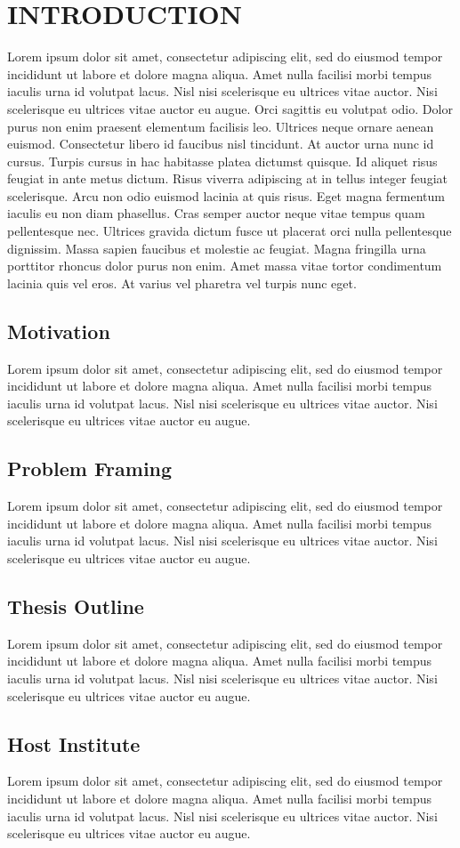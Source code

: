 \chapter{INTRODUCTION}
Lorem ipsum dolor sit amet, consectetur adipiscing elit, sed do eiusmod tempor incididunt ut labore et dolore magna aliqua. Amet nulla facilisi morbi tempus iaculis urna id volutpat lacus. Nisl nisi scelerisque eu ultrices vitae auctor. Nisi scelerisque eu ultrices vitae auctor eu augue. Orci sagittis eu volutpat odio. Dolor purus non enim praesent elementum facilisis leo. Ultrices neque ornare aenean euismod. Consectetur libero id faucibus nisl tincidunt. At auctor urna nunc id cursus. Turpis cursus in hac habitasse platea dictumst quisque. Id aliquet risus feugiat in ante metus dictum. Risus viverra adipiscing at in tellus integer feugiat scelerisque. Arcu non odio euismod lacinia at quis risus. Eget magna fermentum iaculis eu non diam phasellus. Cras semper auctor neque vitae tempus quam pellentesque nec. Ultrices gravida dictum fusce ut placerat orci nulla pellentesque dignissim. Massa sapien faucibus et molestie ac feugiat. Magna fringilla urna porttitor rhoncus dolor purus non enim. Amet massa vitae tortor condimentum lacinia quis vel eros. At varius vel pharetra vel turpis nunc eget.

\section{Motivation}
Lorem ipsum dolor sit amet, consectetur adipiscing elit, sed do eiusmod tempor incididunt ut labore et dolore magna aliqua. Amet nulla facilisi morbi tempus iaculis urna id volutpat lacus. Nisl nisi scelerisque eu ultrices vitae auctor. Nisi scelerisque eu ultrices vitae auctor eu augue.

\section{Problem Framing}
Lorem ipsum dolor sit amet, consectetur adipiscing elit, sed do eiusmod tempor incididunt ut labore et dolore magna aliqua. Amet nulla facilisi morbi tempus iaculis urna id volutpat lacus. Nisl nisi scelerisque eu ultrices vitae auctor. Nisi scelerisque eu ultrices vitae auctor eu augue.

\section{Thesis Outline}
Lorem ipsum dolor sit amet, consectetur adipiscing elit, sed do eiusmod tempor incididunt ut labore et dolore magna aliqua. Amet nulla facilisi morbi tempus iaculis urna id volutpat lacus. Nisl nisi scelerisque eu ultrices vitae auctor. Nisi scelerisque eu ultrices vitae auctor eu augue.

\section{Host Institute}
Lorem ipsum dolor sit amet, consectetur adipiscing elit, sed do eiusmod tempor incididunt ut labore et dolore magna aliqua. Amet nulla facilisi morbi tempus iaculis urna id volutpat lacus. Nisl nisi scelerisque eu ultrices vitae auctor. Nisi scelerisque eu ultrices vitae auctor eu augue.